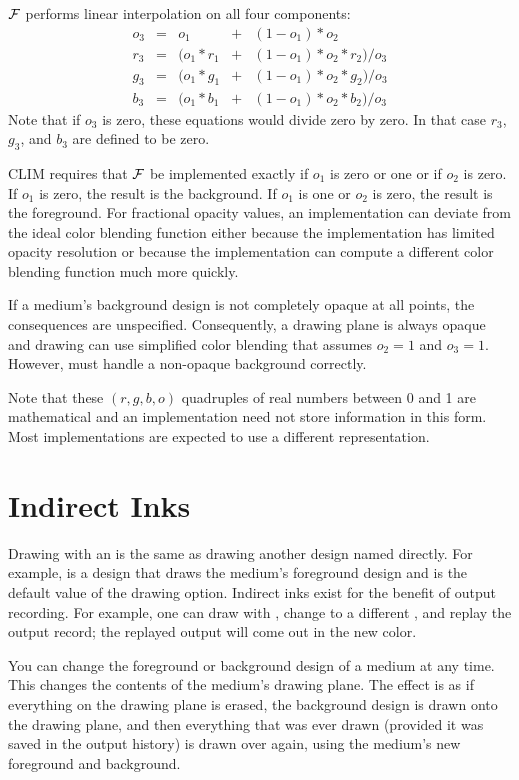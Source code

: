 ${\cal F}$ performs linear interpolation on all four components:
\[ \begin{array}{rcrcl}
o_3 & = &        o_1 & + & (1 - o_1) * o_2 \\
r_3 & = & (o_1 * r_1 & + & (1 - o_1) * o_2 * r_2) / o_3 \\
g_3 & = & (o_1 * g_1 & + & (1 - o_1) * o_2 * g_2) / o_3 \\
b_3 & = & (o_1 * b_1 & + & (1 - o_1) * o_2 * b_2) / o_3
\end{array} \]
Note that if $o_3$ is zero, these equations would divide zero by zero.
In that case $r_3$, $g_3$, and $b_3$ are defined to be zero.

CLIM requires that ${\cal F}$ be implemented exactly if $o_1$ is zero or one or
if $o_2$ is zero.  If $o_1$ is zero, the result is the background.  If $o_1$ is
one or $o_2$ is zero, the result is the foreground.  For fractional opacity
values, an implementation can deviate from the ideal color blending function
either because the implementation has limited opacity resolution or because the
implementation can compute a different color blending function much more
quickly.

If a medium's background design is not completely opaque at all points, the
consequences are unspecified.  Consequently, a drawing plane is always opaque
and drawing can use simplified color blending that assumes $o_2 = 1$ and
$o_3 = 1$.  However,  must handle a non-opaque background
correctly. 

Note that these $(r,g,b,o)$ quadruples of real numbers between 0 and 1 are
mathematical and an implementation need not store information in this form.
Most implementations are expected to use a different representation.


\section {Indirect Inks}

Drawing with an  is the same as drawing another design
named directly.  For example,  is a design that draws the
medium's foreground design and is the default value of the  drawing
option.  Indirect inks exist for the benefit of output recording.  For example,
one can draw with , change to a different
, and replay the output record; the replayed output will
come out in the new color.

You can change the foreground or background design of a medium at any time.
This changes the contents of the medium's drawing plane.  The effect is as if
everything on the drawing plane is erased, the background design is drawn onto
the drawing plane, and then everything that was ever drawn (provided it was
saved in the output history) is drawn over again, using the medium's new
foreground and background.

